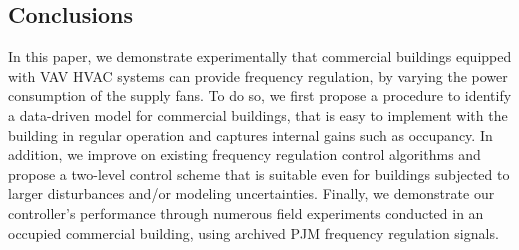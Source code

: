 \subsection{Conclusions}\label{sec:conclusions}
In this paper, we demonstrate experimentally that commercial buildings equipped with VAV HVAC systems can provide frequency regulation, by varying the power consumption of the supply fans.
To do so, we first propose a procedure to identify a data-driven model for commercial buildings, that is easy to implement with the building in regular operation and captures internal gains such as occupancy.
In addition, we improve on existing frequency regulation control algorithms and propose a two-level control scheme that is suitable even for buildings subjected to larger disturbances and/or modeling uncertainties.
Finally, we demonstrate our controller's performance through numerous field experiments conducted in an occupied commercial building, using archived PJM frequency regulation signals.


